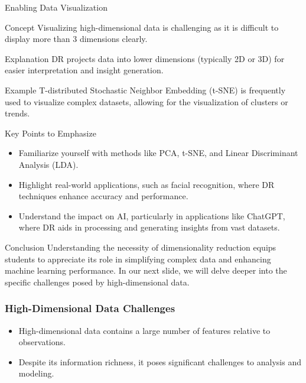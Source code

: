 \documentclass[aspectratio=169]{beamer}
\begin{document}
\begin{frame}[fragile]{Enabling Data Visualization}
    \begin{block}{Concept}
        Visualizing high-dimensional data is challenging as it is difficult to display more than 3 dimensions clearly.
    \end{block}
    \begin{block}{Explanation}
        DR projects data into lower dimensions (typically 2D or 3D) for easier interpretation and insight generation.
    \end{block}
    \begin{block}{Example}
        T-distributed Stochastic Neighbor Embedding (t-SNE) is frequently used to visualize complex datasets, allowing for the visualization of clusters or trends.
    \end{block}
\end{frame}

\begin{frame}[fragile]{Key Points to Emphasize}
    \begin{itemize}
        \item Familiarize yourself with methods like PCA, t-SNE, and Linear Discriminant Analysis (LDA).
        \item Highlight real-world applications, such as facial recognition, where DR techniques enhance accuracy and performance.
        \item Understand the impact on AI, particularly in applications like ChatGPT, where DR aids in processing and generating insights from vast datasets.
    \end{itemize}
\end{frame}

\begin{frame}[fragile]{Conclusion}
    Understanding the necessity of dimensionality reduction equips students to appreciate its role in simplifying complex data and enhancing machine learning performance. 
    In our next slide, we will delve deeper into the specific challenges posed by high-dimensional data.
\end{frame}

\begin{frame}[fragile]
    \frametitle{High-Dimensional Data Challenges}
    \begin{itemize}
        \item High-dimensional data contains a large number of features relative to observations.
        \item Despite its information richness, it poses significant challenges to analysis and modeling.
    \end{itemize}
\end{frame}
\end{document}
